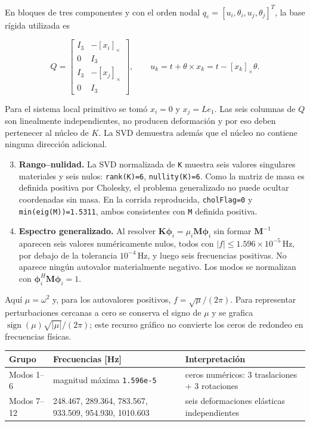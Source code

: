 \documentclass[oneside,a4paper,spanish,links]{amca}
\begin{document}
En bloques de tres componentes y con el orden nodal $q_e=[u_i,\theta_i,u_j,\theta_j]^T$, la base rígida utilizada es

\[
Q=\begin{bmatrix}
I_3 & -[x_i]_\times\\
0   & I_3\\
I_3 & -[x_j]_\times\\
0   & I_3
\end{bmatrix},
\qquad
u_k=t+\theta\times x_k=t-[x_k]_\times\theta.
\]

Para el sistema local primitivo se tomó $x_i=0$ y $x_j=L e_1$. Las seis columnas de $Q$ son linealmente independientes, no producen deformación y por eso deben pertenecer al núcleo de $K$. La SVD demuestra además que el núcleo no contiene ninguna dirección adicional.

\begin{enumerate}
\setcounter{enumi}{2}
\item \textbf{Rango--nulidad.} La SVD normalizada de \texttt{K}\allowbreak{} muestra seis valores singulares materiales y seis nulos: \texttt{rank(K)=6}\allowbreak{}, \texttt{nullity(K)=6}\allowbreak{}. Como la matriz de masa es definida positiva por Cholesky, el problema generalizado no puede ocultar coordenadas sin masa. En la corrida reproducida, \texttt{cholFlag=0}\allowbreak{} y \texttt{min(eig(M))=1.5311}\allowbreak{}, ambos consistentes con \texttt{M}\allowbreak{} definida positiva.
\item \textbf{Espectro generalizado.} Al resolver $\bm K\bm\phi_i=\mu_i\bm M\bm\phi_i$ sin formar $\bm M^{-1}$ aparecen seis valores numéricamente nulos, todos con $|f|\leq1.596\times10^{-5}\,\mathrm{Hz}$, por debajo de la tolerancia $10^{-4}\,\mathrm{Hz}$, y luego seis frecuencias positivas. No aparece ningún autovalor materialmente negativo. Los modos se normalizan con $\bm\phi_i^H\bm M\bm\phi_i=1$.
\end{enumerate}

Aquí $\mu=\omega^2$ y, para los autovalores positivos, $f=\sqrt{\mu}/(2\pi)$. Para representar perturbaciones cercanas a cero se conserva el signo de $\mu$ y se grafica $\operatorname{sign}(\mu)\sqrt{|\mu|}/(2\pi)$; este recurso gráfico no convierte los ceros de redondeo en frecuencias físicas.

\begingroup
\small
\renewcommand{\arraystretch}{1.16}
\begin{center}
\begin{tabularx}{\textwidth}{@{}YYY@{}}
\toprule
\textbf{Grupo} & \textbf{Frecuencias [Hz]} & \textbf{Interpretación} \\
\midrule
Modos 1--6 & magnitud máxima \texttt{1.596e-5}\allowbreak{} & ceros numéricos: 3 traslaciones + 3 rotaciones \\
Modos 7--12 & 248.467, 289.364, 783.567, 933.509, 954.930, 1010.603 & seis deformaciones elásticas independientes \\
\bottomrule
\end{tabularx}
\end{center}
\endgroup
\end{document}
